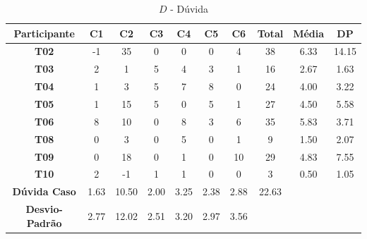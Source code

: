 \begin{table}[htbp]
	\centering
	\caption{$D$ - Dúvida}
	\begin{tabular}{|c|c|c|c|c|c|c|ccc}
		\hline
		\rowcolor[HTML]{D9D9D9} 
		\cellcolor[HTML]{D0CECE}\textbf{Participante} & \textbf{C1} & \textbf{C2} & \textbf{C3} & \textbf{C4} & \textbf{C5} & \textbf{C6} & \multicolumn{1}{c|}{\cellcolor[HTML]{D9D9D9}\textbf{Total}} & \multicolumn{1}{c|}{\cellcolor[HTML]{D9D9D9}\textbf{Média}} & \multicolumn{1}{c|}{\cellcolor[HTML]{D9D9D9}\textbf{DP}} \\ \hline
		\cellcolor[HTML]{F2F2F2}\textbf{T02} & -1 & 35 & 0 & 0 & 0 & 4 & \multicolumn{1}{c|}{38} & \multicolumn{1}{c|}{6.33} & \multicolumn{1}{c|}{14.15} \\ \hline
		\rowcolor[HTML]{D9D9D9} 
		\cellcolor[HTML]{F2F2F2}\textbf{T03} & 2 & 1 & 5 & 4 & 3 & 1 & \multicolumn{1}{c|}{\cellcolor[HTML]{D9D9D9}16} & \multicolumn{1}{c|}{\cellcolor[HTML]{D9D9D9}2.67} & \multicolumn{1}{c|}{\cellcolor[HTML]{D9D9D9}1.63} \\ \hline
		\cellcolor[HTML]{F2F2F2}\textbf{T04} & 1 & 3 & 5 & 7 & 8 & 0 & \multicolumn{1}{c|}{24} & \multicolumn{1}{c|}{4.00} & \multicolumn{1}{c|}{3.22} \\ \hline
		\rowcolor[HTML]{D9D9D9} 
		\cellcolor[HTML]{F2F2F2}\textbf{T05} & 1 & 15 & 5 & 0 & 5 & 1 & \multicolumn{1}{c|}{\cellcolor[HTML]{D9D9D9}27} & \multicolumn{1}{c|}{\cellcolor[HTML]{D9D9D9}4.50} & \multicolumn{1}{c|}{\cellcolor[HTML]{D9D9D9}5.58} \\ \hline
		\cellcolor[HTML]{F2F2F2}\textbf{T06} & 8 & 10 & 0 & 8 & 3 & 6 & \multicolumn{1}{c|}{35} & \multicolumn{1}{c|}{5.83} & \multicolumn{1}{c|}{3.71} \\ \hline
		\rowcolor[HTML]{D9D9D9} 
		\cellcolor[HTML]{F2F2F2}\textbf{T08} & 0 & 3 & 0 & 5 & 0 & 1 & \multicolumn{1}{c|}{\cellcolor[HTML]{D9D9D9}9} & \multicolumn{1}{c|}{\cellcolor[HTML]{D9D9D9}1.50} & \multicolumn{1}{c|}{\cellcolor[HTML]{D9D9D9}2.07} \\ \hline
		\cellcolor[HTML]{F2F2F2}\textbf{T09} & 0 & 18 & 0 & 1 & 0 & 10 & \multicolumn{1}{c|}{29} & \multicolumn{1}{c|}{4.83} & \multicolumn{1}{c|}{7.55} \\ \hline
		\rowcolor[HTML]{D9D9D9} 
		\cellcolor[HTML]{F2F2F2}\textbf{T10} & 2 & -1 & 1 & 1 & 0 & 0 & \multicolumn{1}{c|}{\cellcolor[HTML]{D9D9D9}3} & \multicolumn{1}{c|}{\cellcolor[HTML]{D9D9D9}0.50} & \multicolumn{1}{c|}{\cellcolor[HTML]{D9D9D9}1.05} \\ \hline
		\textbf{Dúvida Caso} & 1.63 & 10.50 & 2.00 & 3.25 & 2.38 & 2.88 & \multicolumn{1}{c|}{22.63} & \multicolumn{1}{l}{} & \multicolumn{1}{l}{} \\ \cline{1-8}
		\cellcolor[HTML]{D9D9D9}\textbf{Desvio-Padrão} & \cellcolor[HTML]{D9D9D9}2.77 & \cellcolor[HTML]{D9D9D9}12.02 & \cellcolor[HTML]{D9D9D9}2.51 & \cellcolor[HTML]{D9D9D9}3.20 & \cellcolor[HTML]{D9D9D9}2.97 & \cellcolor[HTML]{D9D9D9}3.56 & \multicolumn{1}{l}{} & \multicolumn{1}{l}{} & \multicolumn{1}{l}{} \\ \cline{1-7}
	\end{tabular}
	\label{tab:F3_A3_DUVIDA}
\end{table}

